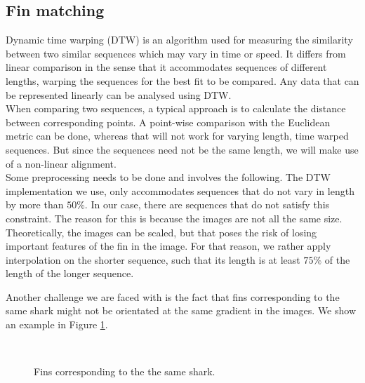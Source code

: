 \documentclass[a4paper,10pt]{article}
\begin{document}
\subsection{Fin matching}
Dynamic time warping (DTW) is an algorithm used for
measuring the similarity between two similar sequences which may vary in time or
speed.  It differs from linear comparison in the
sense that it accommodates sequences of different lengths, warping the
sequences for the best fit to be compared.
Any data that can be represented linearly can be analysed using DTW.  \\

When comparing two sequences, a typical approach is to calculate the distance
between corresponding points. A point-wise comparison with the Euclidean
metric can be done, whereas that will not work for varying length, time warped sequences.  But since the sequences
need not be the same length, we will make use of a non-linear
alignment. \\

Some preprocessing needs to be done and involves the following.
The DTW implementation we use, only accommodates
sequences that do not vary in length by more than $50\%$. In our case, there are sequences
that do not satisfy this constraint.  The reason for this is because the images are not all the same size.
Theoretically, the images can be scaled, but that poses the risk of losing important features of the fin in the image.
For that reason, we rather apply interpolation on the shorter sequence, 
 such that its length is at least $75\%$ of the length of the longer sequence. 
 
Another challenge we are faced with is the fact that fins corresponding to the 
same shark might not be orientated at the same gradient in the images.  
We show an example in Figure \ref{gradient}.  \\
 
\begin{figure}[H]
\centering
\mbox{ \quad
{}}
\caption{Fins corresponding to the the same shark.}
\label{gradient}
\end{figure}
\end{document}
